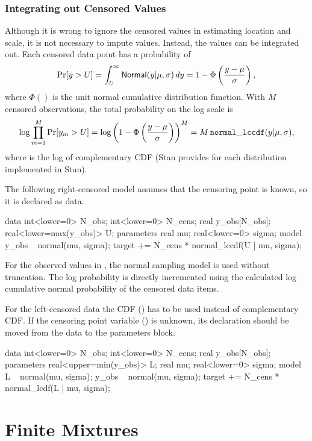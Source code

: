 \subsection{Integrating out Censored Values}

Although it is wrong to ignore the censored values in estimating
location and scale, it is not necessary to impute values.  Instead,
the values can be integrated out.  Each censored data point has a
probability of
%
\[
\mbox{Pr}[y > U] 
= \int_U^{\infty} \distro{Normal}(y|\mu,\sigma) \, dy
= 1 - \Phi\left(\frac{y - \mu}{\sigma}\right),
\]
%
where $\Phi()$ is the unit normal cumulative distribution function.
With $M$ censored observations, the total probability on the log scale
is
\[
\log \prod_{m=1}^M \mbox{Pr}[y_m > U]
= \log \left( 1 - \Phi\left(\frac{y - \mu}{\sigma}\right)\right)^{M}
= M \, \code{normal\_lccdf}(y | \mu, \sigma),
\]
%
where  is the log of complementary CDF
(Stan provides  for each distribution
implemented in Stan).

The following right-censored model assumes
that the censoring point is known, so it is declared as data.
%
\begin{stancode}
data {
  int<lower=0> N_obs;
  int<lower=0> N_cens;
  real y_obs[N_obs];
  real<lower=max(y_obs)> U;
}
parameters {
  real mu;
  real<lower=0> sigma;
}
model {
  y_obs ~ normal(mu, sigma); 
  target += N_cens * normal_lccdf(U | mu, sigma);
}
\end{stancode}
%
For the observed values in , the normal sampling model is
used without truncation.  The log probability is directly incremented
using the calculated log cumulative normal probability of the censored
data items.

For the left-censored data the CDF () has to be
used instead of complementary CDF.  If the censoring point variable
() is unknown, its declaration should be moved from the data
to the parameters block.
%
\begin{stancode}
data {
  int<lower=0> N_obs;
  int<lower=0> N_cens;
  real y_obs[N_obs];
}
parameters {
  real<upper=min(y_obs)> L;
  real mu;
  real<lower=0> sigma;
}
model {
  L ~ normal(mu, sigma);
  y_obs ~ normal(mu, sigma);
  target += N_cens * normal_lcdf(L | mu, sigma);
}
\end{stancode}
%


\chapter{Finite Mixtures}\label{mixture-modeling.chapter}

